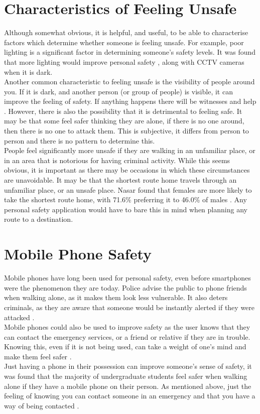 \documentclass[a4paper]{report}
\begin{document}
\section{Characteristics of Feeling Unsafe}
\label{sec:FeelingUnsafe}
Although somewhat obvious, it is helpful, and useful, to be able to characterise factors which determine whether someone is feeling unsafe. For example, poor lighting is a significant factor in determining someone's safety levels. It was found that more lighting would improve personal safety \cite{mccarthy}, along with CCTV cameras when it is dark. \\ Another common characteristic to feeling unsafe is the visibility of people around you. If it is dark, and another person (or group of people) is visible, it can improve the feeling of safety. If anything happens there will be witnesses and help \cite{mccarthy}. However, there is also the possibility that it is detrimental to feeling safe. It may be that some feel safer thinking they are alone, if there is no one around, then there is no one to attack them. This is subjective, it differs from person to person and there is no pattern to determine this. \\
People feel significantly more unsafe if they are walking in an unfamiliar place, or in an area that is notorious for having criminal activity. While this seems obvious, it is important as there may be occasions in which these circumstances are unavoidable. It may be that the shortest route home travels through an unfamiliar place, or an unsafe place. Nasar found that females are more likely to take the shortest route home, with 71.6\% preferring it to 46.0\% of males \cite{nasar}. Any personal safety application would have to bare this in mind when planning any route to a destination.  

\section{Mobile Phone Safety}
\label{sec:PhoneSafety}
Mobile phones have long been used for personal safety, even before smartphones were the phenomenon they are today. Police advise the public to phone friends when walking alone, as it makes them look less vulnerable. It also deters criminals, as they are aware that someone would be instantly alerted if they were attacked \cite{mccarthy}.\\ Mobile phones could also be used to improve safety as the user knows that they can contact the emergency services, or a friend or relative if they are in trouble. Knowing this, even if it is not being used, can take a weight of one's mind and make them feel safer \cite{dalfiore}.\\
Just having a phone in their possession can improve someone's sense of safety, it was found that the majority of undergraduate students feel safer when walking alone if they have a mobile phone on their person. As mentioned above, just the feeling of knowing you can contact someone in an emergency and that you have a way of being contacted \cite{hecht}.   
\end{document}
